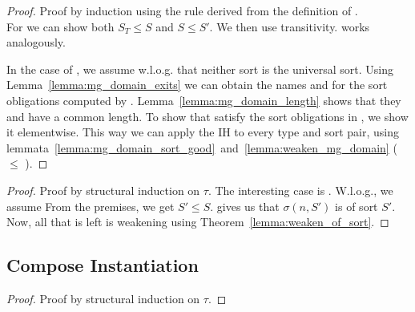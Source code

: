 \begin{theorem}
\end{theorem}
\begin{proof}
    Proof by induction using the rule derived from the definition of .\\
    For  we can show both \(S_T \leq S\) and \(S \leq S'\).
    We then use transitivity.
     works analogously.\par
    In the case of , we assume w.l.o.g. that neither sort is the universal sort.
    Using Lemma~\ref{lemma:mg_domain_exits} we can obtain the names  and  for the sort obligations computed by .
    Lemma~\ref{lemma:mg_domain_length} shows that they and  have a common length.
    To show that  satisfy the sort obligations in , we show it elementwise.
    This way we can apply the IH to every type and sort pair, using lemmata~\ref{lemma:mg_domain_sort_good}\ and~\ref{lemma:weaken_mg_domain} ( \(\leq\) ).
\end{proof}

\begin{corollary}
\end{corollary}
\begin{proof}
Proof by structural induction on \(\tau\).
The interesting case is .
W.l.o.g., we assume 
From the premises, we get \(S' \leq S\).
 gives us that \(\sigma (n, S')\) is of sort \(S'\).
Now, all that is left is weakening using Theorem~\ref{lemma:weaken_of_sort}.
\end{proof}

\subsection{Compose Instantiation}

\begin{lemma}
\end{lemma}
\begin{proof}
    Proof by structural induction on \(\tau\).
\end{proof}

\begin{quote}
\begin{isabelle}
     
\end{isabelle}
\end{quote}



